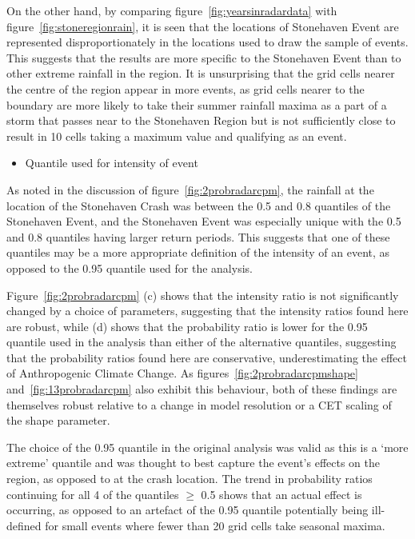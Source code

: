 On the other hand,
    by comparing figure~\ref{fig:yearsinradardata} with figure~\ref{fig:stoneregionrain},
    it is seen that the locations of Stonehaven Event are represented disproportionately in the
    locations used to draw the sample of events.
This suggests that the results are more specific to the Stonehaven Event than to other extreme rainfall in the region.
It is unsurprising that the grid cells nearer the centre of the region appear in more events,
    as grid cells nearer to the boundary are more likely to take their summer rainfall maxima
    as a part of a storm that passes near to the Stonehaven Region but is not sufficiently close to
    result in 10 cells taking a maximum value and qualifying as an event.

\begin{itemize}\item Quantile used for intensity of event\end{itemize}

As noted in the discussion of figure~\ref{fig:2probradarcpm},
    the rainfall at the location of the Stonehaven Crash was between the 0.5 and 0.8 quantiles of the Stonehaven Event,
    and the Stonehaven Event was especially unique with the 0.5 and 0.8 quantiles having larger return periods.
This suggests that one of these quantiles may be a more appropriate definition of the intensity of an event,
    as opposed to the 0.95 quantile used for the analysis.

Figure~\ref{fig:2probradarcpm} (c) shows that the intensity ratio is not significantly changed by a choice of parameters,
    suggesting that the intensity ratios found here are robust,
    while (d) shows that the probability ratio is lower for the 0.95 quantile used in the analysis than either of the alternative quantiles,
    suggesting that the probability ratios found here are conservative,
    underestimating the effect of Anthropogenic Climate Change.
As figures~\ref{fig:2probradarcpmshape} and~\ref{fig:13probradarcpm}
    also exhibit this behaviour,
    both of these findings are themselves robust relative to a change in model resolution or a CET scaling of the shape parameter.

The choice of the 0.95 quantile in the original analysis was valid as this is a `more extreme' quantile and was thought to best capture the event's
    effects on the region, as opposed to at the crash location.
The trend in probability ratios continuing for all 4 of the quantiles $\geq$ 0.5 shows that an actual effect is occurring,
    as opposed to an artefact of the 0.95 quantile potentially being ill-defined for small events where fewer than 20 grid cells take seasonal maxima.

